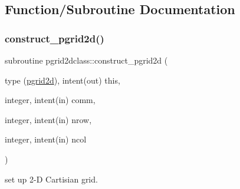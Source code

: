 \subsection{Function/\+Subroutine Documentation}
\mbox{\label{namespacepgrid2dclass_a93b626c7a473ab28463a29b9661dcefb}} 
\subsubsection{\texorpdfstring{construct\_pgrid2d()}{construct\_pgrid2d()}}
{\footnotesize\ttfamily subroutine pgrid2dclass\+::construct\+\_\+pgrid2d (\begin{DoxyParamCaption}\item[{type (\mbox{\hyperlink{namespacepgrid2dclass_structpgrid2dclass_1_1pgrid2d}{pgrid2d}}), intent(out)}]{this,  }\item[{integer, intent(in)}]{comm,  }\item[{integer, intent(in)}]{nrow,  }\item[{integer, intent(in)}]{ncol }\end{DoxyParamCaption})}



set up 2-\/D Cartisian grid. 

